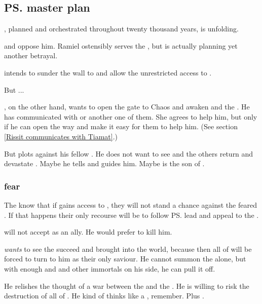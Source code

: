 \begin{garbage}
\subsection{\ps{\Daggerrain}{} master plan}
, planned and orchestrated throughout twenty thousand years, is unfolding. 

\Secherdamon{} and \Ishnaruchaefir{} oppose him. Ramiel ostensibly serves the \banes, but is actually planning yet another betrayal.

\Daggerrain{} intends to sunder the wall to \Erebos{} and allow the \Voidbringer{} unrestricted access to \Miith{}. 

But ...

\Secherdamon, on the other hand, wants to open the gate to Chaos and awaken \Tiamat{} and the \firstgendragons. He has communicated with \KhothSell{} or another one of them. She agrees to help him, but only if he can open the way and make it easy for them to help him. (See section \ref{Rissit communicates with Tiamat}.)

But \Iurzmacul{} plots against his fellow \firstgendragons{}. He does not want to see \Tiamat{} and the others return and devastate \Miith{}. Maybe he tells \Ishnaruchaefir{} and guides him. Maybe \Ishnaruchaefir{} is the son of \Iurzmacul.





\subsubsection{\Dragons{} fear \Voidbringer}
The \dragons{} know that if \Voidbringer{} gains access to \Miith, they will not stand a chance against the feared \baneking. 
If that happens their only recourse will be to follow \ps{\Vizsherioch} lead and appeal to the \xss. 

\Vizsherioch{} will not accept \Ishnaruchaefir{} as an ally. 
He would prefer to kill him. 

\Vizsherioch{} \emph{wants} to see the \banes{} succeed and \Voidbringer{} brought into the world, because then all of \Miith{} will be forced to turn to him as their only saviour. 
He cannot summon the \xss{} alone, but with enough \dragons{} and \quiljaaran{} and other immortals on his side, he can pull it off. 

He relishes the thought of a war between the \xss{} and the \banelords. 
He is willing to risk the destruction of all of \Miith. 
He kind of thinks like a \xss, remember. 
Plus . 










\end{garbage}
